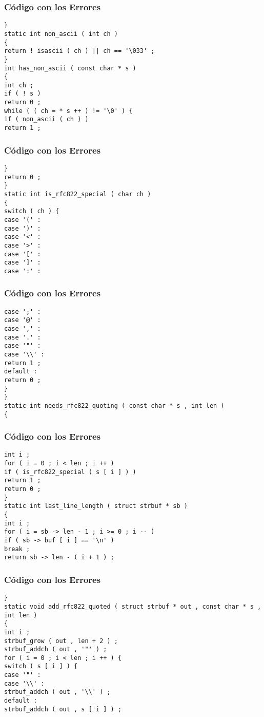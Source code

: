 \documentclass{beamer}
\begin{document}
\begin{frame}[fragile]
\frametitle{C\'odigo con los Errores}
\begin{verbatim}
} 
static int non_ascii ( int ch ) 
{ 
return ! isascii ( ch ) || ch == '\033' ; 
} 
int has_non_ascii ( const char * s ) 
{ 
int ch ; 
if ( ! s ) 
return 0 ; 
while ( ( ch = * s ++ ) != '\0' ) { 
if ( non_ascii ( ch ) ) 
return 1 ; 
\end{verbatim}
\end{frame}
\begin{frame}[fragile]
\frametitle{C\'odigo con los Errores}
\begin{verbatim}
} 
return 0 ; 
} 
static int is_rfc822_special ( char ch ) 
{ 
switch ( ch ) { 
case '(' : 
case ')' : 
case '<' : 
case '>' : 
case '[' : 
case ']' : 
case ':' : 
\end{verbatim}
\end{frame}
\begin{frame}[fragile]
\frametitle{C\'odigo con los Errores}
\begin{verbatim}
case ';' : 
case '@' : 
case ',' : 
case '.' : 
case '"' : 
case '\\' : 
return 1 ; 
default : 
return 0 ; 
} 
} 
static int needs_rfc822_quoting ( const char * s , int len ) 
{ 
\end{verbatim}
\end{frame}
\begin{frame}[fragile]
\frametitle{C\'odigo con los Errores}
\begin{verbatim}
int i ; 
for ( i = 0 ; i < len ; i ++ ) 
if ( is_rfc822_special ( s [ i ] ) ) 
return 1 ; 
return 0 ; 
} 
static int last_line_length ( struct strbuf * sb ) 
{ 
int i ; 
for ( i = sb -> len - 1 ; i >= 0 ; i -- ) 
if ( sb -> buf [ i ] == '\n' ) 
break ; 
return sb -> len - ( i + 1 ) ; 
\end{verbatim}
\end{frame}
\begin{frame}[fragile]
\frametitle{C\'odigo con los Errores}
\begin{verbatim}
} 
static void add_rfc822_quoted ( struct strbuf * out , const char * s , int len ) 
{ 
int i ; 
strbuf_grow ( out , len + 2 ) ; 
strbuf_addch ( out , '"' ) ; 
for ( i = 0 ; i < len ; i ++ ) { 
switch ( s [ i ] ) { 
case '"' : 
case '\\' : 
strbuf_addch ( out , '\\' ) ; 
default : 
strbuf_addch ( out , s [ i ] ) ; 
\end{verbatim}
\end{frame}
\end{document}
